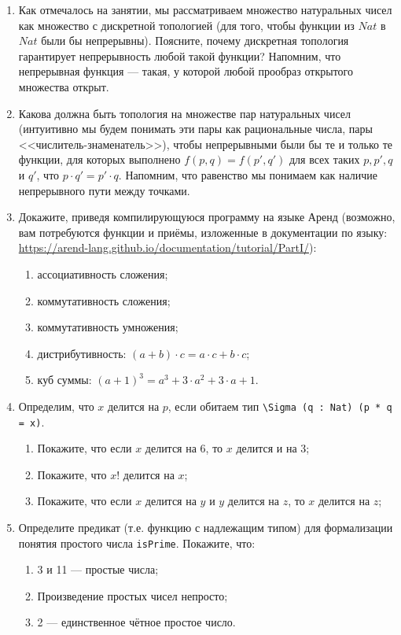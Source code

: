 \documentclass[10pt,a4paper,oneside]{article}
\begin{document}
\begin{enumerate}
\item Как отмечалось на занятии, мы рассматриваем множество натуральных чисел как множество с дискретной топологией
(для того, чтобы функции из $Nat$ в $Nat$ были бы непрерывны). Поясните, почему дискретная топология гарантирует
непрерывность любой такой функции? Напомним, что непрерывная функция --- такая, у которой любой прообраз открытого
множества открыт.
                                                    
\item Какова должна быть топология на множестве
пар натуральных чисел (интуитивно мы будем понимать эти пары как рациональные числа, пары <<числитель-знаменатель>>), 
чтобы непрерывными были бы те и только те функции, для которых выполнено $f(p,q) = f(p',q')$ для всех 
таких $p,p',q$ и $q'$, что $p\cdot q' = p'\cdot q$. Напомним, что равенство мы понимаем как наличие непрерывного пути 
между точками.

\item Докажите, приведя компилирующуюся программу на языке Аренд (возможно, вам потребуются функции и приёмы, 
изложенные в документации по языку: \url{https://arend-lang.github.io/documentation/tutorial/PartI/}):
\begin{enumerate}
\item ассоциативность сложения;
\item коммутативность сложения;
\item коммутативность умножения;
\item дистрибутивность: $(a + b)\cdot c = a\cdot c + b \cdot c$;
\item куб суммы: $(a + 1)^3 = a^3 + 3\cdot a^2 + 3 \cdot a + 1$.
\end{enumerate}

\item Определим, что $x$ делится на $p$, если обитаем тип \verb!\Sigma (q : Nat) (p * q = x)!.
\begin{enumerate}
\item Покажите, что если $x$ делится на 6, то $x$ делится и на 3;
\item Покажите, что $x!$ делится на $x$;
\item Покажите, что если $x$ делится на $y$ и $y$ делится на $z$, то $x$ делится на $z$;
\end{enumerate}

\item Определите предикат (т.е. функцию с надлежащим типом) для формализации понятия простого числа \verb!isPrime!.
Покажите, что:
\begin{enumerate}
\item 3 и 11 --- простые числа;
\item Произведение простых чисел непросто;
\item 2 --- единственное чётное простое число.
\end{enumerate}
\end{enumerate}
\end{document}
